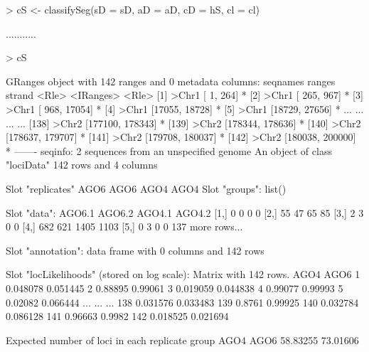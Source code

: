 \documentclass[a4paper]{article}
\begin{document}
\begin{Schunk}
\begin{Sinput}
> cS <- classifySeg(sD = sD, aD = aD, cD = hS, cl = cl)      
\end{Sinput}
\begin{Soutput}
...........
\end{Soutput}
\begin{Sinput}
> cS
\end{Sinput}
\begin{Soutput}
GRanges object with 142 ranges and 0 metadata columns:
        seqnames           ranges strand
           <Rle>        <IRanges>  <Rle>
    [1]    >Chr1   [    1,   264]      *
    [2]    >Chr1   [  265,   967]      *
    [3]    >Chr1   [  968, 17054]      *
    [4]    >Chr1   [17055, 18728]      *
    [5]    >Chr1   [18729, 27656]      *
    ...      ...              ...    ...
  [138]    >Chr2 [177100, 178343]      *
  [139]    >Chr2 [178344, 178636]      *
  [140]    >Chr2 [178637, 179707]      *
  [141]    >Chr2 [179708, 180037]      *
  [142]    >Chr2 [180038, 200000]      *
  -------
  seqinfo: 2 sequences from an unspecified genome
An object of class "lociData"
142 rows and 4 columns

Slot "replicates"
AGO6 AGO6 AGO4 AGO4
Slot "groups":
list()

Slot "data":
     AGO6.1 AGO6.2 AGO4.1 AGO4.2
[1,]      0      0      0      0
[2,]     55     47     65     85
[3,]      2      3      0      0
[4,]    682    621   1405   1103
[5,]      0      3      0      0
137 more rows...

Slot "annotation":
data frame with 0 columns and 142 rows

Slot "locLikelihoods" (stored on log scale):
Matrix with  142  rows.
        AGO4     AGO6
1   0.048078 0.051445
2    0.88895  0.99061
3   0.019059 0.044838
4    0.99077  0.99993
5    0.02082 0.066444
...      ...      ...
138 0.031576 0.033483
139   0.8761  0.99925
140 0.032784 0.086128
141  0.96663   0.9982
142 0.018525 0.021694

Expected number of loci in each replicate group
    AGO4     AGO6 
58.83255 73.01606 
\end{Soutput}
\end{Schunk}
\end{document}
